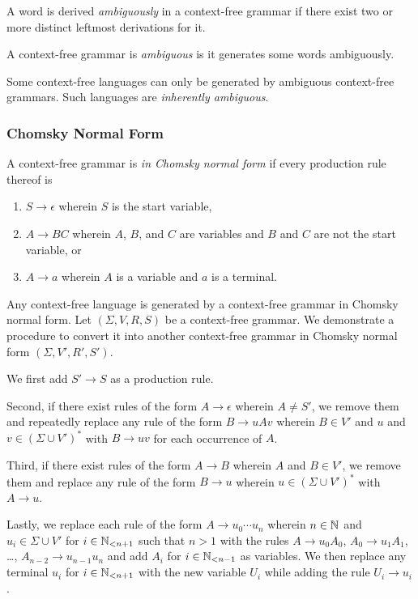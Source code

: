 \Bdf
    A word is derived \emph{ambiguously} in a context-free grammar if there exist
    two or more distinct leftmost derivations for it.

    A context-free grammar is \emph{ambiguous} is it generates some words
    ambiguously.
\Edf

Some context-free languages can only be generated by ambiguous context-free
grammars. Such languages are \emph{inherently ambiguous}.

\subsubsection{Chomsky Normal Form}

\Bdf
    A context-free grammar is \emph{in Chomsky normal form} if every production
    rule thereof is
    \begin{enumerate}
        \item \(S \to \epsilon\) wherein \(S\) is the start variable,
        \item \(A \to B C\) wherein \(A\), \(B\), and \(C\) are variables and
        \(B\) and \(C\) are not the start variable, or
        \item \(A \to a\) wherein \(A\) is a variable and \(a\) is a terminal.
    \end{enumerate}
\Edf

\Bth
    Any context-free language is generated by a context-free grammar in Chomsky
    normal form.
\Eth
\Bpr
    Let \((\Sigma, V, R, S)\) be a context-free grammar. We demonstrate a
    procedure to convert it into another context-free grammar in Chomsky normal
    form \((\Sigma, V', R', S')\).

    We first add \(S' \to S\) as a production rule.

    Second, if there exist rules of the form \(A \to \epsilon\) wherein \(A \neq
    S'\), we remove them and repeatedly replace any rule of the form \(B \to u A
    v\) wherein \(B \in V'\) and \(u\) and \(v \in (\Sigma \cup V')^*\) with \(B
    \to u v\) for each occurrence of \(A\).

    Third, if there exist rules of the form \(A \to B\) wherein \(A\) and \(B
    \in V'\), we remove them and replace any rule of the form \(B \to u\)
    wherein \(u \in (\Sigma \cup V')^*\) with \(A \to u\).

    Lastly, we replace each rule of the form \(A \to u_0 \cdots u_n\) wherein
    \(n \in \setnat\) and \(u_i \in \Sigma \cup V'\) for \(i \in \Nln[n + 1]\)
    such that \(n > 1\) with the rules \(A \to u_0 A_0\), \(A_0 \to u_1 A_1\),
    \ldots, \(A_{n - 2} \to u_{n - 1} u_n\) and add \(A_i\) for \(i \in \Nln[n -
    1]\) as variables. We then replace any terminal \(u_i\) for \(i \in \Nln[n +
    1]\) with the new variable \(U_i\) while adding the rule \(U_i \to u_i\).

